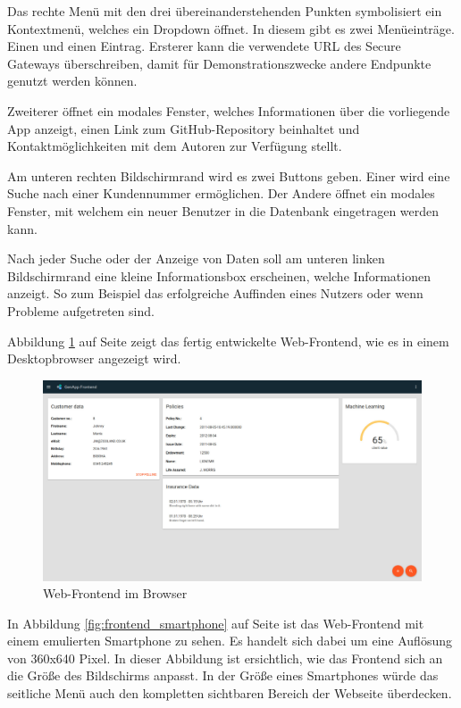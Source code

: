 Das rechte Menü mit den drei übereinanderstehenden Punkten symbolisiert ein Kontextmenü, welches ein Dropdown öffnet. In
diesem gibt es zwei Menüeinträge. Einen  und einen  Eintrag. Ersterer kann die verwendete URL
des Secure Gateways überschreiben, damit für Demonstrationszwecke andere Endpunkte genutzt werden können.

Zweiterer öffnet ein modales Fenster, welches Informationen über die vorliegende App
anzeigt, einen Link zum GitHub-Repository beinhaltet und Kontaktmöglichkeiten mit dem Autoren zur Verfügung stellt.

Am unteren rechten Bildschirmrand wird es zwei Buttons geben. Einer wird eine Suche nach einer Kundennummer ermöglichen.
Der Andere öffnet ein modales Fenster, mit welchem ein neuer Benutzer in die Datenbank eingetragen werden kann.

Nach jeder Suche oder der Anzeige von Daten soll am unteren linken Bildschirmrand eine kleine Informationsbox erscheinen,
welche Informationen anzeigt. So zum Beispiel das erfolgreiche Auffinden eines Nutzers oder wenn Probleme aufgetreten sind.

Abbildung \ref{fig:frontend_browser} auf Seite \pageref{fig:frontend_browser} zeigt das fertig entwickelte Web-Frontend,
wie es in einem Desktopbrowser angezeigt wird.

\begin{figure}[h]
 \centering
   \includegraphics[scale=0.29]{images/kapitel_4/frontend_browser.pdf}
 \caption{Web-Frontend im Browser}
 \label{fig:frontend_browser}
\end{figure}

In Abbildung \ref{fig:frontend_smartphone} auf Seite \pageref{fig:frontend_smartphone} ist das Web-Frontend mit einem
emulierten Smartphone zu sehen. Es handelt sich dabei um eine Auflösung von 360x640 Pixel. In dieser Abbildung
ist ersichtlich, wie das Frontend sich an die Größe des Bildschirms anpasst. In der Größe eines Smartphones würde das
seitliche Menü auch den kompletten sichtbaren Bereich der Webseite überdecken.

